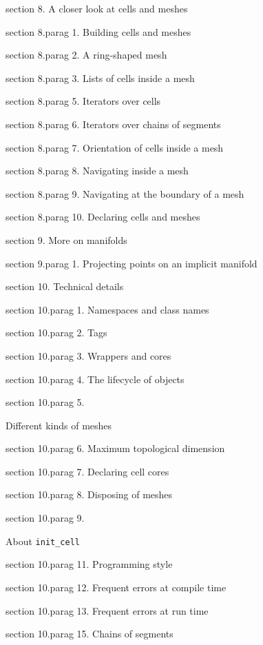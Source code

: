 \medskip\noindent
\numb section 8. A closer look at cells and meshes

\numb section 8.\numb parag 1. Building cells and meshes

\numb section 8.\numb parag 2. A ring-shaped mesh

\numb section 8.\numb parag 3. Lists of cells inside a mesh

\numb section 8.\numb parag 5. Iterators over cells

\numb section 8.\numb parag 6. Iterators over chains of segments

\numb section 8.\numb parag 7. Orientation of cells inside a mesh

\numb section 8.\numb parag 8. Navigating inside a mesh

\numb section 8.\numb parag 9. Navigating at the boundary of a mesh

\numb section 8.\numb parag 10. Declaring cells and meshes


\medskip\noindent
\numb section 9. More on manifolds

\numb section 9.\numb parag 1. Projecting points on an implicit manifold


\medskip\noindent
\numb section 10. Technical details

\numb section 10.\numb parag 1. Namespaces and class names

\numb section 10.\numb parag 2. Tags

\numb section 10.\numb parag 3. Wrappers and cores

\numb section 10.\numb parag 4. The lifecycle of objects

\numb section 10.\numb parag 5. Different kinds of meshes

\numb section 10.\numb parag 6. Maximum topological dimension

\numb section 10.\numb parag 7. Declaring cell cores

\numb section 10.\numb parag 8. Disposing of meshes

\numb section 10.\numb parag 9.
About {\tt init\_cell}

\numb section 10.\numb parag 11. Programming style

\numb section 10.\numb parag 12. Frequent errors at compile time

\numb section 10.\numb parag 13. Frequent errors at run time

\numb section 10.\numb parag 15. Chains of segments

